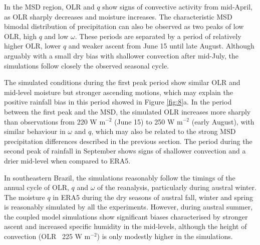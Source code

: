 In the MSD region, OLR and $q$ show signs of convective activity from mid-April, as OLR sharply decreases and moisture increases.
The characteristic MSD bimodal distribution of precipitation can also be observed as two peaks of low OLR, high $q$ and low $\omega$.
These periods are separated by a period of relatively higher OLR, lower $q$ and weaker ascent from June 15 until late August.
Although arguably with a small dry bias with shallower convection after mid-July, the simulations follow closely the observed seasonal cycle.

The simulated conditions during the first peak period show similar OLR and mid-level moisture but stronger ascending motions, which may explain the positive rainfall bias in this period showed in Figure \ref{fig:8}a.
In the period between the first peak and the MSD, the simulated OLR increases more sharply than observations from 220 W m$^{-2}$ (June 15) to 250 W m$^{-2}$ (early August), with similar behaviour in $\omega$ and $q$, which may also be related to the strong MSD precipitation differences described in the previous section.
The period during the second peak of rainfall in September shows signs of shallower convection and a drier mid-level when compared to ERA5.

In southeastern Brazil, the simulations reasonably follow the timings of the annual cycle of OLR, $q$ and $\omega$ of the reanalysis, particularly during austral winter. The moisture $q$ in ERA5 during  the dry seasons of austral fall, winter and spring is reasonably simulated by all the experiments. However, during austral summer, the coupled model simulations show significant biases characterised by stronger ascent and increased specific humidity in the mid-levels, although the height of convection (OLR~ 225 W m$^{-2}$) is only modestly higher in the simulations.

